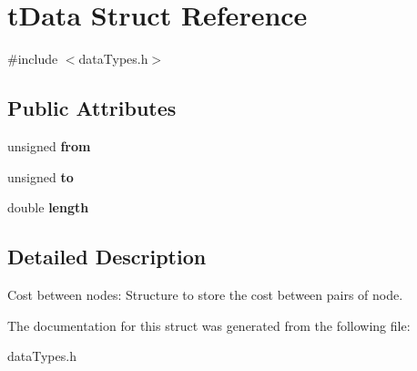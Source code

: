 \hypertarget{structt_data}{
\section{tData Struct Reference}
\label{structt_data}
}


{\ttfamily \#include $<$dataTypes.h$>$}

\subsection*{Public Attributes}
\begin{DoxyCompactItemize}
\item 
\hypertarget{structt_data_ab27b75f0f56b6e88c694cf298e678068}{
unsigned {\bfseries from}}
\label{structt_data_ab27b75f0f56b6e88c694cf298e678068}

\item 
\hypertarget{structt_data_a4bfb76815156d5c2524f09804161eed4}{
unsigned {\bfseries to}}
\label{structt_data_a4bfb76815156d5c2524f09804161eed4}

\item 
\hypertarget{structt_data_a40b10dd93cbbc727320a76092de99cd5}{
double {\bfseries length}}
\label{structt_data_a40b10dd93cbbc727320a76092de99cd5}

\end{DoxyCompactItemize}


\subsection{Detailed Description}
Cost between nodes: Structure to store the cost between pairs of node. 

The documentation for this struct was generated from the following file:\begin{DoxyCompactItemize}
\item 
dataTypes.h\end{DoxyCompactItemize}
